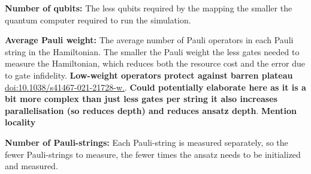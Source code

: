 \documentclass[twoside]{article}
\begin{document}
\begin{romanlist}
\item \textbf{Number of qubits:} The less qubits required by the mapping the smaller the quantum computer required to run the simulation.
\item \textbf{Average Pauli weight:} The average number of Pauli operators in each Pauli string in the Hamiltonian. The smaller the Pauli weight the less gates needed to measure the Hamiltonian, which reduces both the resource cost and the error due to gate infidelity. \textbf{Low-weight operators protect against barren plateau} \url{doi:10.1038/s41467-021-21728-w.}. \textbf{Could potentially elaborate here as it is a bit more complex than just less gates per string it also increases parallelisation (so reduces depth) and reduces ansatz depth}. \textbf{Mention locality}
\item \textbf{Number of Pauli-strings:} Each Pauli-string is measured separately, so the fewer Pauli-strings to measure, the fewer times the ansatz needs to be initialized and measured.
\end{romanlist}
\end{document}
